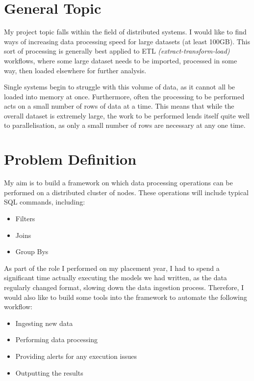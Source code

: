 \documentclass[12pt]{article}
\begin{document}
	\maketitle
	
	\section{General Topic}
	
	My project topic falls within the field of distributed systems. I would like to find ways of increasing data processing speed for large datasets (at least 100GB). This sort of processing is generally best applied to ETL \textit{(extract-transform-load)} workflows, where some large dataset needs to be imported, processed in some way, then loaded elsewhere for further analysis. \medskip
	
	Single systems begin to struggle with this volume of data, as it cannot all be loaded into memory at once. Furthermore, often the processing to be performed acts on a small number of rows of data at a time. This means that while the overall dataset is extremely large, the work to be performed lends itself quite well to parallelisation, as only a small number of rows are necessary at any one time.
	
	\section{Problem Definition}
	
	My aim is to build a framework on which data processing operations can be performed on a distributed cluster of nodes. These operations will include typical SQL commands, including:
	\begin{itemize}
		\item Filters
		\item Joins
		\item Group Bys
	\end{itemize}
	
	As part of the role I performed on my placement year, I had to spend a significant time actually executing the models we had written, as the data regularly changed format, slowing down the data ingestion process. Therefore, I would also like to build some tools into the framework to automate the following workflow:
	\begin{itemize}
		\item Ingesting new data
		\item Performing data processing
		\item Providing alerts for any execution issues
		\item Outputting the results
	\end{itemize}
	
\end{document}
